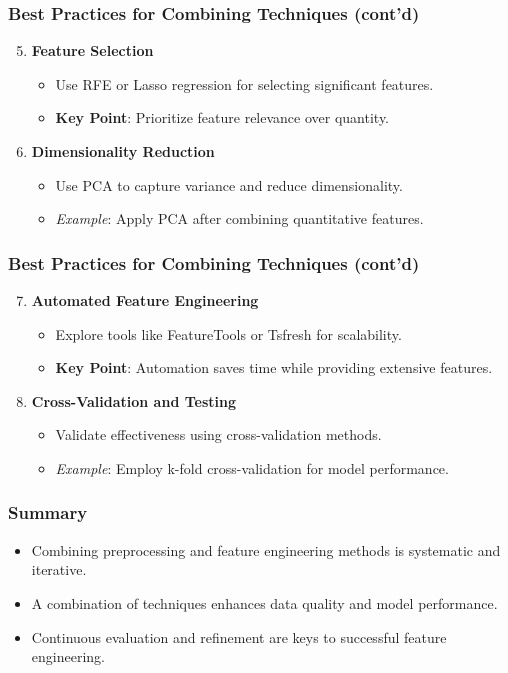 \documentclass[aspectratio=169]{beamer}
\begin{document}
\begin{frame}
  \frametitle{Best Practices for Combining Techniques (cont'd)}
  \begin{enumerate}
    \setcounter{enumi}{4}
    \item \textbf{Feature Selection}
      \begin{itemize}
        \item Use RFE or Lasso regression for selecting significant features.
        \item \textbf{Key Point}: Prioritize feature relevance over quantity.
      \end{itemize}
    \item \textbf{Dimensionality Reduction}
      \begin{itemize}
        \item Use PCA to capture variance and reduce dimensionality.
        \item \textit{Example}: Apply PCA after combining quantitative features.
      \end{itemize}
  \end{enumerate}
\end{frame}

\begin{frame}
  \frametitle{Best Practices for Combining Techniques (cont'd)}
  \begin{enumerate}
    \setcounter{enumi}{6}
    \item \textbf{Automated Feature Engineering}
      \begin{itemize}
        \item Explore tools like FeatureTools or Tsfresh for scalability.
        \item \textbf{Key Point}: Automation saves time while providing extensive features.
      \end{itemize}
    \item \textbf{Cross-Validation and Testing}
      \begin{itemize}
        \item Validate effectiveness using cross-validation methods.
        \item \textit{Example}: Employ k-fold cross-validation for model performance.
      \end{itemize}
  \end{enumerate}
\end{frame}

\begin{frame}
  \frametitle{Summary}
  \begin{itemize}
    \item Combining preprocessing and feature engineering methods is systematic and iterative.
    \item A combination of techniques enhances data quality and model performance.
    \item Continuous evaluation and refinement are keys to successful feature engineering.
  \end{itemize}
\end{frame}
\end{document}
